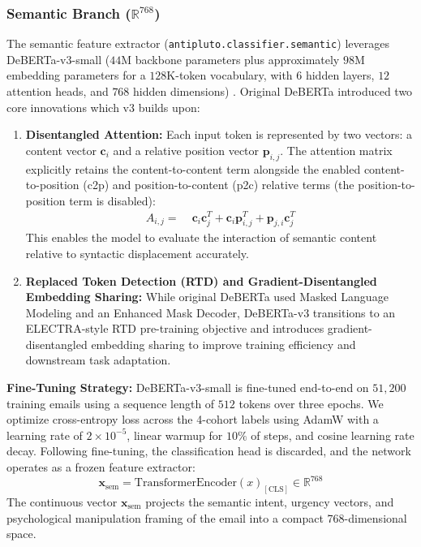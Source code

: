 \documentclass[journal]{IEEEtran}
\begin{document}
\subsubsection{Semantic Branch ($\mathbb{R}^{768}$)}
The semantic feature extractor (\texttt{antipluto.classifier.semantic}) leverages DeBERTa-v3-small ($44\text{M}$ backbone parameters plus approximately $98\text{M}$ embedding parameters for a $128\text{K}$-token vocabulary, with $6$ hidden layers, $12$ attention heads, and $768$ hidden dimensions) \cite{he2023debertav3}. Original DeBERTa introduced two core innovations which v3 builds upon:
\begin{enumerate}
    \item \textbf{Disentangled Attention:} Each input token is represented by two vectors: a content vector $\mathbf{c}_i$ and a relative position vector $\mathbf{p}_{i,j}$. The attention matrix explicitly retains the content-to-content term alongside the enabled content-to-position (c2p) and position-to-content (p2c) relative terms (the position-to-position term is disabled):
    \begin{equation}
    \begin{aligned}
        A_{i,j} = \; & \mathbf{c}_i \mathbf{c}_j^T + \mathbf{c}_i \mathbf{p}_{i,j}^T + \mathbf{p}_{j,i} \mathbf{c}_j^T
    \end{aligned}
    \end{equation}
    This enables the model to evaluate the interaction of semantic content relative to syntactic displacement accurately.
    \item \textbf{Replaced Token Detection (RTD) and Gradient-Disentangled Embedding Sharing:} While original DeBERTa used Masked Language Modeling and an Enhanced Mask Decoder, DeBERTa-v3 transitions to an ELECTRA-style RTD pre-training objective and introduces gradient-disentangled embedding sharing to improve training efficiency and downstream task adaptation.
\end{enumerate}

\textbf{Fine-Tuning Strategy:} DeBERTa-v3-small is fine-tuned end-to-end on $51,200$ training emails using a sequence length of $512$ tokens over three epochs. We optimize cross-entropy loss across the 4-cohort labels using AdamW with a learning rate of $2 \times 10^{-5}$, linear warmup for $10\%$ of steps, and cosine learning rate decay. Following fine-tuning, the classification head is discarded, and the network operates as a frozen feature extractor:
\begin{equation}
    \mathbf{x}_{\text{sem}} = \text{TransformerEncoder}(x)_{[\text{CLS}]} \in \mathbb{R}^{768}
\end{equation}
The continuous vector $\mathbf{x}_{\text{sem}}$ projects the semantic intent, urgency vectors, and psychological manipulation framing of the email into a compact 768-dimensional space.
\end{document}
